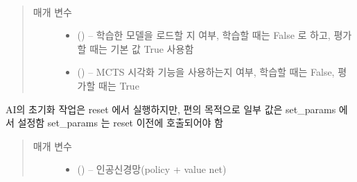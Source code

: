\documentclass[letterpaper,10pt,english]{sphinxmanual}
\begin{document}
\begin{fulllineitems}
\begin{fulllineitems}
\label{\detokenize{agents.self_learning:agents.self_learning.agent.Agent.planner}}
\end{fulllineitems}


\begin{fulllineitems}
\label{\detokenize{agents.self_learning:agents.self_learning.agent.Agent.reset}}~\begin{quote}\begin{description}
\item[{매개 변수}] \leavevmode\begin{itemize}
\item {} 
 () -- 학습한 모델을 로드할 지 여부, 학습할 때는 False 로 하고,
평가할 때는 기본 값 True 사용함

\item {} 
 () -- MCTS 시각화 기능을 사용하는지 여부, 학습할 때는 False, 평가할 때는 True

\end{itemize}

\end{description}\end{quote}

\end{fulllineitems}


\begin{fulllineitems}
\label{\detokenize{agents.self_learning:agents.self_learning.agent.Agent.set_params}}
AI의 초기화 작업은 reset 에서 실행하지만, 편의 목적으로 일부 값은 set\_params 에서 설정함
set\_params 는 reset 이전에 호출되어야 함
\begin{quote}\begin{description}
\item[{매개 변수}] \leavevmode\begin{itemize}
\item {} 
 () -- 인공신경망(policy + value net)


\end{itemize}
\end{description}
\end{quote}
\end{fulllineitems}
\end{fulllineitems}
\end{document}
